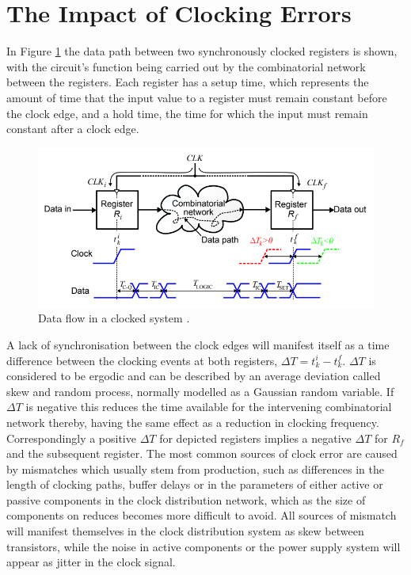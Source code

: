 \section{The Impact of Clocking Errors}
In Figure \ref{fig:eldar_why_precise_clocking} the data path between two synchronously clocked registers is shown, with the circuit's function being carried out by the combinatorial network between the registers.
Each register has a setup time, which represents the amount of time that the input value to a register must remain constant before the clock edge, and a hold time, the time for which the input must remain constant after a clock edge.
\begin{figure}[h]
	\centering
	\includegraphics[scale=0.6]{../eldar_why_precise_clocking}
	\caption[Data flow in a clocked system]{Data flow in a clocked system \cite{zianbetov2013phd}.}
	\label{fig:eldar_why_precise_clocking}
\end{figure}

A lack of synchronisation between the clock edges will manifest itself as a time difference between the clocking events at both registers, $\Delta T = t^i_k - t^f_k$. $\Delta T$ is considered to be ergodic and can be described by an average deviation called skew and random process, normally modelled as a Gaussian random variable. If $\Delta T$ is negative this reduces the time available for the intervening combinatorial network thereby, having the same effect as a reduction in clocking frequency. Correspondingly a positive $\Delta T$ for depicted registers implies a negative $\Delta T$ for $R_f$ and the subsequent register. 
The most common sources of clock error are caused by mismatches which usually stem from production, such as differences in the length of clocking paths, buffer delays or in the parameters of either active or passive components in the clock distribution network, which as the size of components on  reduces becomes more difficult to avoid. All sources of mismatch will manifest themselves in the clock distribution system as skew between transistors, while the noise in active components or the power supply system will appear as jitter in the clock signal.

